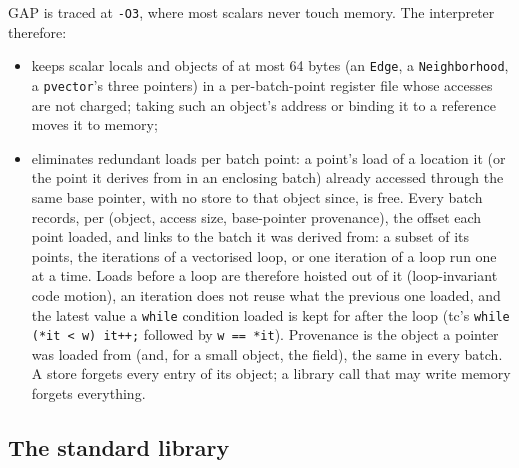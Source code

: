\documentclass[11pt]{article}
\newcommand{\code}[1]{\texttt{#1}}
\begin{document}
GAP is traced at \code{-O3}, where most scalars never touch memory. The interpreter therefore:
\begin{itemize}
\item keeps scalar locals and objects of at most 64 bytes (an \code{Edge}, a \code{Neighborhood}, a
\code{pvector}'s three pointers) in a per-batch-point register file whose accesses are not charged; taking such an
object's address or binding it to a reference moves it to memory;
\item eliminates redundant loads per batch point: a point's load of a location it (or the point it derives from in
an enclosing batch) already accessed through the same base pointer, with no store to that object since, is free.
Every batch records, per (object, access size, base-pointer provenance), the offset each point loaded, and links to
the batch it was derived from: a subset of its points, the iterations of a vectorised loop, or one iteration of a
loop run one at a time. Loads before a loop are therefore hoisted out of it (loop-invariant code motion), an
iteration does not reuse what the previous one loaded, and the latest value a \code{while} condition loaded is kept
for after the loop (tc's \code{while (*it < w) it++;} followed by \code{w == *it}). Provenance is the object a
pointer was loaded from (and, for a small object, the field), the same in every batch. A store forgets every entry
of its object; a library call that may write memory forgets everything.
\end{itemize}

\subsection{The standard library}
\end{document}
